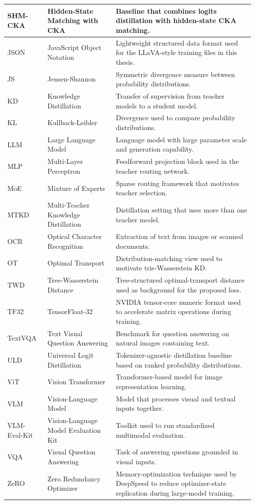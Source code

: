 \begin{small}
\begin{longtable}{|>{\raggedright\arraybackslash}p{2.1cm}|>{\raggedright\arraybackslash}p{5.8cm}|>{\raggedright\arraybackslash}p{6.2cm}|}
\hline
SHM-CKA & Hidden-State Matching with CKA & Baseline that combines logits distillation with hidden-state CKA matching. \\
\hline
JSON & JavaScript Object Notation & Lightweight structured data format used for the LLaVA-style training files in this thesis. \\
\hline
JS & Jensen-Shannon & Symmetric divergence measure between probability distributions. \\
\hline
KD & Knowledge Distillation & Transfer of supervision from teacher models to a student model. \\
\hline
KL & Kullback-Leibler & Divergence used to compare probability distributions. \\
\hline
LLM & Large Language Model & Language model with large parameter scale and generation capability. \\
\hline
MLP & Multi-Layer Perceptron & Feedforward projection block used in the teacher routing network. \\
\hline
MoE & Mixture of Experts & Sparse routing framework that motivates teacher selection. \\
\hline
MTKD & Multi-Teacher Knowledge Distillation & Distillation setting that uses more than one teacher model. \\
\hline
OCR & Optical Character Recognition & Extraction of text from images or scanned documents. \\
\hline
OT & Optimal Transport & Distribution-matching view used to motivate trie-Wasserstein KD. \\
\hline
TWD & Tree-Wasserstein Distance & Tree-structured optimal-transport distance used as background for the proposed loss. \\
\hline
TF32 & TensorFloat-32 & NVIDIA tensor-core numeric format used to accelerate matrix operations during training. \\
\hline
TextVQA & Text Visual Question Answering & Benchmark for question answering on natural images containing text. \\
\hline
ULD & Universal Logit Distillation & Tokenizer-agnostic distillation baseline based on ranked probability distributions. \\
\hline
ViT & Vision Transformer & Transformer-based model for image representation learning. \\
\hline
VLM & Vision-Language Model & Model that processes visual and textual inputs together. \\
\hline
VLM-Eval-Kit & Vision-Language Model Evaluation Kit & Toolkit used to run standardized multimodal evaluation. \\
\hline
VQA & Visual Question Answering & Task of answering questions grounded in visual inputs. \\
\hline
ZeRO & Zero Redundancy Optimizer & Memory-optimization technique used by DeepSpeed to reduce optimizer-state replication during large-model training. \\
\hline
\end{longtable}
\end{small}
